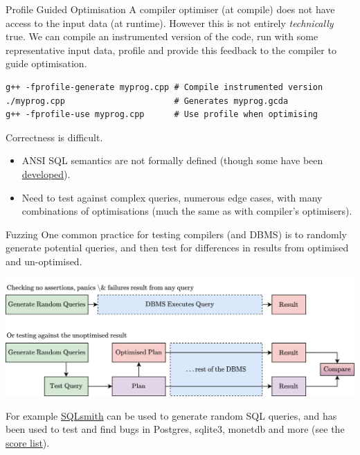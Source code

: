 \begin{sidenotebox}{Profile Guided Optimisation}
    A compiler optimiser (at compile) does not have access to the input data (at runtime). However this is not entirely \textit{technically} true. We can compile an instrumented version of the code, run with some representative input data, profile and provide this feedback to the compiler to guide optimisation.
    \begin{verbatim}
g++ -fprofile-generate myprog.cpp # Compile instrumented version
./myprog.cpp                      # Generates myprog.gcda
g++ -fprofile-use myprog.cpp      # Use profile when optimising
    \end{verbatim}
\end{sidenotebox}

Correctness is difficult.
\begin{itemize}
    \item ANSI SQL semantics are not formally defined (though some have been \href{https://dl.acm.org/doi/10.1145/111197.111212}{developed}).
    \item Need to test against complex queries, numerous edge cases, with many combinations of optimisations (much the same as with compiler's optimisers).
\end{itemize}

\begin{sidenotebox}{Fuzzing}
    One common practice for testing compilers (and DBMS) is to randomly generate potential queries, and then test for differences in results from optimised and un-optimised.
    \begin{center}
        \includegraphics[width=.8\textwidth]{optimisation/images/fuzzing.drawio.png}
    \end{center}
    For example \href{https://github.com/anse1/sqlsmith}{SQLsmith} can be used to generate random SQL queries, and has been used to test and find bugs in Postgres, sqlite3, monetdb and more (see the \href{https://github.com/anse1/sqlsmith/wiki#score-list}{score list}).
\end{sidenotebox}

